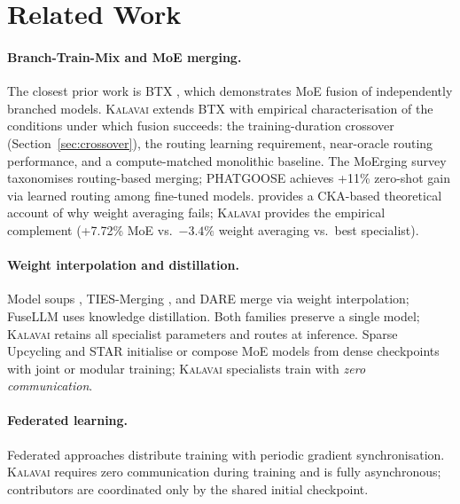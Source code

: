 \documentclass{article}
\newcommand{\kalavai}{\textsc{Kalavai}\xspace}
\begin{document}
\section{Related Work}
\label{sec:related}

\paragraph{Branch-Train-Mix and MoE merging.} The closest prior work is BTX \citep{sukhbaatar2024branchtrainmix}, which demonstrates MoE fusion of independently branched models. \kalavai extends BTX with empirical characterisation of the conditions under which fusion succeeds: the training-duration crossover (Section~\ref{sec:crossover}), the routing learning requirement, near-oracle routing performance, and a compute-matched monolithic baseline. The MoErging survey \citep{yadav2024merging} taxonomises routing-based merging; PHATGOOSE \citep{muqeeth2024phatgoose} achieves +11\% zero-shot gain via learned routing among fine-tuned models. \citet{pari2025merging} provides a CKA-based theoretical account of why weight averaging fails; \kalavai provides the empirical complement (+7.72\% MoE vs.\ $-3.4\%$ weight averaging vs.\ best specialist).

\paragraph{Weight interpolation and distillation.} Model soups \citep{wortsman2022modelsoups}, TIES-Merging \citep{yadav2023tiesmerging}, and DARE \citep{yu2023dare} merge via weight interpolation; FuseLLM \citep{wan2024fusellm} uses knowledge distillation. Both families preserve a single model; \kalavai retains all specialist parameters and routes at inference. Sparse Upcycling \citep{komatsuzaki2023sparseupcycling} and STAR \citep{qin2025star} initialise or compose MoE models from dense checkpoints with joint or modular training; \kalavai specialists train with \emph{zero communication}.

\paragraph{Federated learning.} Federated approaches \citep{mcmahan2017federated} distribute training with periodic gradient synchronisation. \kalavai requires zero communication during training and is fully asynchronous; contributors are coordinated only by the shared initial checkpoint.
\end{document}
